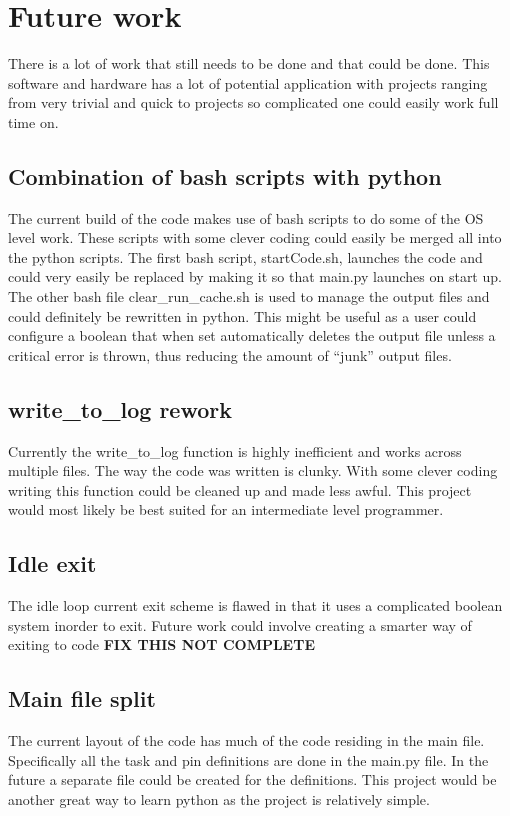 \documentclass[titlepage]{article}
\begin{document}
\section{Future work}
\label{section:future}
There is a lot of work that still needs to be done and that could be done. This software and hardware has a lot of potential application with projects ranging from very trivial and quick to projects so complicated one could easily work full time on.

\subsection{Combination of bash scripts with python}
\label{section:picombo}
The current build of the code makes use of bash scripts to do some of the OS level work. These scripts with some clever coding could easily be merged all into the python scripts. The first bash script, startCode.sh, launches the code and could very easily be replaced by making it so that main.py launches on start up. The other bash file clear\_run\_cache.sh is used to manage the output files and could definitely be rewritten in python. This might be useful as a user could configure a boolean that when set automatically deletes the output file unless a critical error is thrown, thus reducing the amount of ``junk'' output files.

\subsection{write\_to\_log rework}
\label{section:rework-log}
Currently the write\_to\_log function is highly inefficient and works across multiple files. The way the code was written is clunky. With some clever coding writing this function could be cleaned up and made less awful. This project would most likely be best suited for an intermediate level programmer.

\subsection{Idle exit}
\label{section:idleE}
The idle loop current exit scheme is flawed in that it uses a complicated boolean system inorder to exit. Future work could involve creating a smarter way of exiting to code \textbf{FIX THIS NOT COMPLETE}

\subsection{Main file split}
\label{section:mainsplit}
The current layout of the code has much of the code residing in the main file. Specifically all the task and pin definitions are done in the main.py file. In the future a separate file could be created for the definitions. This project would be another great way to learn python as the project is relatively simple.
\end{document}
